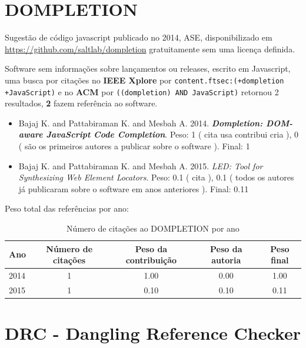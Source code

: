 \section{DOMPLETION}

Sugestão de código javascript
publicado no 2014, ASE,
disponibilizado em \url{https://github.com/saltlab/dompletion}
gratuitamente
sem uma licença definida.

Software sem informações sobre lançamentos ou releases,
escrito em Javascript,
uma busca por citações no {\bf IEEE Xplore} por
\texttt{content.ftsec:(+dompletion +JavaScript)}
e no {\bf ACM} por
\texttt{((dompletion) AND JavaScript)}
retornou
2 resultados,
{\bf 2} fazem referência ao software.

\begin{itemize}
\item Bajaj K. and Pattabiraman K. and Mesbah A.
      2014.
        \textbf{\textit{ Dompletion: DOM-aware JavaScript Code Completion}}.
      Peso:
      1 (
          cita
          usa
          contribui
          cria
      ),
      0 (
são os primeiros autores a publicar sobre o software
      ).
      Final:
      1

\item Bajaj K. and Pattabiraman K. and Mesbah A.
      2015.
        \textit{ LED: Tool for Synthesizing Web Element Locators}.
      Peso:
      0.1 (
          cita
      ),
      0.1 (
todos os autores já publicaram sobre o software em anos anteriores
      ).
      Final:
      0.11

\end{itemize}

Peso total das referências por ano:

\begin{table}[h]
\caption{Número de citações ao DOMPLETION por ano}
\centering
\begin{tabular}{| l | c | c | c | c |}
  \hline
  Ano & Número de citações & Peso da contribuição & Peso da autoria & Peso final \\
  \hline
  2014
    & 1
    & 1.00
    & 0.00
    & 1.00 \\
  2015
    & 1
    & 0.10
    & 0.10
    & 0.11 \\
  \hline
\end{tabular}
\end{table}


\section{DRC - Dangling Reference Checker}

